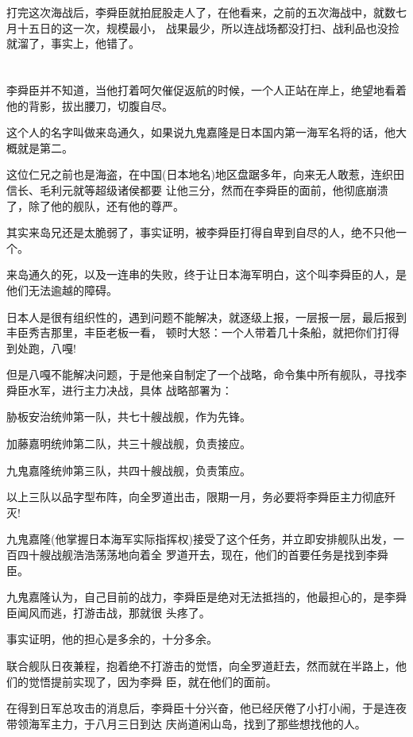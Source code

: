 \documentclass[11pt,a4paper,onecolumn]{article}
\begin{document}
打完这次海战后，李舜臣就拍屁股走人了，在他看来，之前的五次海战中，就数七月十五日的这一次，规模最小，
战果最少，所以连战场都没打扫、战利品也没捡就溜了，事实上，他错了。

\section[\thesection]{}

李舜臣并不知道，当他打着呵欠催促返航的时候，一个人正站在岸上，绝望地看着他的背影，拔出腰刀，切腹自尽。

这个人的名字叫做来岛通久，如果说九鬼嘉隆是日本国内第一海军名将的话，他大概就是第二。

这位仁兄之前也是海盗，在中国(日本地名)地区盘踞多年，向来无人敢惹，连织田信长、毛利元就等超级诸侯都要
让他三分，然而在李舜臣的面前，他彻底崩溃了，除了他的舰队，还有他的尊严。

其实来岛兄还是太脆弱了，事实证明，被李舜臣打得自卑到自尽的人，绝不只他一个。

来岛通久的死，以及一连串的失败，终于让日本海军明白，这个叫李舜臣的人，是他们无法逾越的障碍。

日本人是很有组织性的，遇到问题不能解决，就逐级上报，一层报一层，最后报到丰臣秀吉那里，丰臣老板一看，
顿时大怒：一个人带着几十条船，就把你们打得到处跑，八嘎!

但是八嘎不能解决问题，于是他亲自制定了一个战略，命令集中所有舰队，寻找李舜臣水军，进行主力决战，具体
战略部署为：

胁板安治统帅第一队，共七十艘战舰，作为先锋。

加藤嘉明统帅第二队，共三十艘战舰，负责接应。

九鬼嘉隆统帅第三队，共四十艘战舰，负责策应。

以上三队以品字型布阵，向全罗道出击，限期一月，务必要将李舜臣主力彻底歼灭!

九鬼嘉隆(他掌握日本海军实际指挥权)接受了这个任务，并立即安排舰队出发，一百四十艘战舰浩浩荡荡地向着全
罗道开去，现在，他们的首要任务是找到李舜臣。

九鬼嘉隆认为，自己目前的战力，李舜臣是绝对无法抵挡的，他最担心的，是李舜臣闻风而逃，打游击战，那就很
头疼了。

事实证明，他的担心是多余的，十分多余。

联合舰队日夜兼程，抱着绝不打游击的觉悟，向全罗道赶去，然而就在半路上，他们的觉悟提前实现了，因为李舜
臣，就在他们的面前。

在得到日军总攻击的消息后，李舜臣十分兴奋，他已经厌倦了小打小闹，于是连夜带领海军主力，于八月三日到达
庆尚道闲山岛，找到了那些想找他的人。
\end{document}
